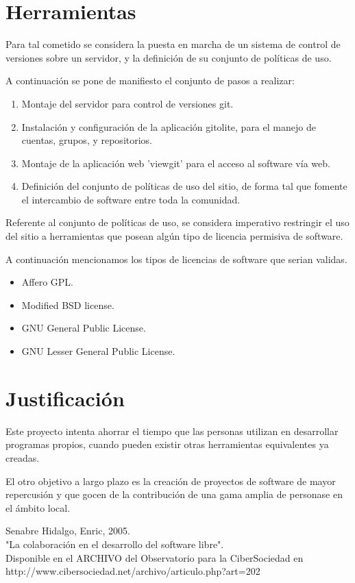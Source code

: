 \documentclass[letter,12pt]{article}
\begin{document}
\section{Herramientas}
Para tal cometido se considera la puesta en marcha de un sistema de control de versiones sobre un
servidor, y la definición de su conjunto de políticas de uso.

A continuación se pone de manifiesto el conjunto de pasos a realizar:

\begin{enumerate}
\item Montaje del servidor para control de versiones git.
\item Instalación y configuración de la aplicación gitolite, para el manejo de cuentas, grupos, y
repositorios.
\item Montaje de la aplicación web 'viewgit' para el acceso al software vía web.
\item Definición del conjunto de políticas de uso del sitio, de forma tal que fomente el
intercambio de software entre toda la comunidad.
\end{enumerate}

Referente al conjunto de políticas de uso, se considera imperativo restringir el uso del sitio a
herramientas que posean algún tipo de licencia permisiva de software\cite{Senabre}.

A continuación mencionamos los tipos de licencias de software que serian validas.

\begin{itemize}
\item Affero GPL.
\item Modified BSD license.
\item GNU General Public License.
\item GNU Lesser General Public License.
\end{itemize}

\section{Justificación}
Este proyecto intenta ahorrar el tiempo que las personas utilizan en de\-sa\-rro\-llar programas
propios, cuando pueden existir otras herramientas equivalentes ya creadas.

El otro objetivo a largo plazo es la creación de proyectos de software de mayor repercusión y que
gocen de la contribución de una gama amplia de personase en el ámbito local.

\begin{thebibliography}{99}
 Senabre Hidalgo, Enric, 2005.\\
"La colaboración en el desarrollo del software libre".\\
Disponible en el ARCHIVO del Observatorio para la CiberSociedad en
http://www.cibersociedad.net/archivo/articulo.php?art=202
\end{thebibliography}
\end{document}
